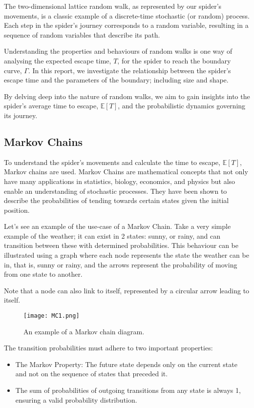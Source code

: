 \documentclass[12pt,a4paper]{article}
\begin{document}
The two-dimensional lattice random walk, as represented by our spider's movements, is a classic example of a discrete-time stochastic (or random) process. Each step in the spider's journey corresponds to a random variable, resulting in a sequence of random variables that describe its path.

Understanding the properties and behaviours of random walks is one way of analysing the expected escape time, \(T\), for the spider to reach the boundary curve, \(\Gamma\). In this report, we investigate the relationship between the spider's escape time and the parameters of the boundary; including size and shape.

By delving deep into the nature of random walks, we aim to gain insights into the spider's average time to escape, \(\mathbb{E}[T]\), and the probabilistic dynamics governing its journey.

\subsection{Markov Chains}

To understand the spider's movements and calculate the time to escape, \(\mathbb{E}[T]\), Markov chains are used. Markov Chains are mathematical concepts that not only have many applications in statistics, biology, economics, and physics but also enable an understanding of stochastic processes. They have been shown to describe the probabilities of tending towards certain states given the initial position.

Let's see an example of the use-case of a Markov Chain.
Take a very simple example of the weather; it can exist in 2 states: sunny, or rainy, and can transition between these with determined probabilities. This behaviour can be illustrated using a graph where each node represents the state the weather can be in, that is, sunny or rainy, and the arrows represent the probability of moving from one state to another. 

Note that a node can also link to itself, represented by a circular arrow leading to itself.

\begin{figure}[htbp]
    \centering
    \texttt{[image: MC1.png]}
    \caption{An example of a Markov chain diagram.}
    \label{fig:MSRC1}
\end{figure}

The transition probabilities must adhere to two important properties:

\begin{itemize}
    \item The Markov Property: The future state depends only on the current state and not on the sequence of states that preceded it.
    \item The sum of probabilities of outgoing transitions from any state is always 1, ensuring a valid probability distribution.
\end{itemize}
\end{document}
